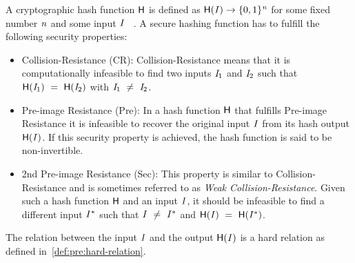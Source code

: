 
\begin{definition}\label{def:pre:hash-function}
    A cryptographic hash function $\mathsf{H}$ is defined as $\mathsf{H} (\mathit{I}) \rightarrow \{0,1\}^{\mathit{n}}$ for some fixed number $\mathit{n}$ and some input $\mathit{I}$ ~\cite{al2011cryptographic}.
    A secure hashing function has to fulfill the following security properties:
    \begin{itemize}
        \item Collision-Resistance (CR): Collision-Resistance means that it is computationally infeasible to find two inputs $\mathit{I}_1$ and $\mathit{I}_2$ such that
        $\mathsf{H} (\mathit{I}_1) ~=~ \mathsf{H} (\mathit{I}_2)$ with $\mathit{I}_1 ~\neq~ \mathit{I}_2$.
        \item Pre-image Resistance (Pre): In a hash function $\mathsf{H}$ that fulfills Pre-image Resistance it is infeasible to recover the original input $\mathit{I}$ from its hash output $\mathsf{H} (\mathit{I})$.
        If this security property is achieved, the hash function is said to be non-invertible.
        \item 2nd Pre-image Resistance (Sec):  This property is similar to Collision-Resistance and is sometimes referred to as \textit{Weak Collision-Resistance}.
        Given such a hash function $\mathsf{H}$ and an input $\mathit{I}$, it should be infeasible to find a different input $\mathit{I}^*$ such that $\mathit{I} ~\neq~ \mathit{I}^*$
        and $\mathsf{H} (\mathit{I}) ~=~ \mathsf{H} (\mathit{I}^*)$.
    \end{itemize}
    The relation between the input $\mathit{I}$ and the output $\mathsf{H} (\mathit{I})$ is a hard relation as defined in~\cref{def:pre:hard-relation}.
\end{definition}

